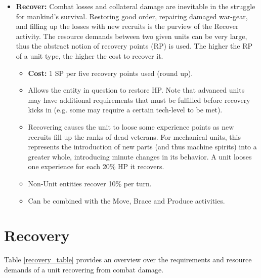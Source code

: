 \begin{itemize}
	\item \textbf{Recover:} Combat losses and collateral damage are inevitable in the struggle for mankind's survival. Restoring good order, repairing damaged war-gear, and filling up the losses with new recruits is the purview of the Recover activity. The resource demands between two given units can be very large, thus the abstract notion of recovery points (RP) is used. The higher the RP of a unit type, the higher the cost to recover it.
	\begin{itemize}
		\item \textbf{Cost:} 1 SP per five recovery points used (round up).
		\item Allows the entity in question to restore HP. Note that advanced units may have additional requirements that must be fulfilled before recovery kicks in (e.g. some may require a certain tech-level to be met).
		\item Recovering causes the unit to loose some experience points as new recruits fill up the ranks of dead veterans. For mechanical units, this represents the introduction of new parts (and thus machine spirits) into a greater whole, introducing minute changes in its behavior. A unit looses one experience for each 20\% HP it recovers.
		\item Non-Unit entities recover 10\% per turn.
		\item Can be combined with the Move, Brace and Produce activities.
	\end{itemize}   
\end{itemize}

\section{Recovery} \label{recovery_section}
Table \ref{recovery_table} provides an overview over the requirements and resource demands of a unit recovering from combat damage.

\onecolumn
